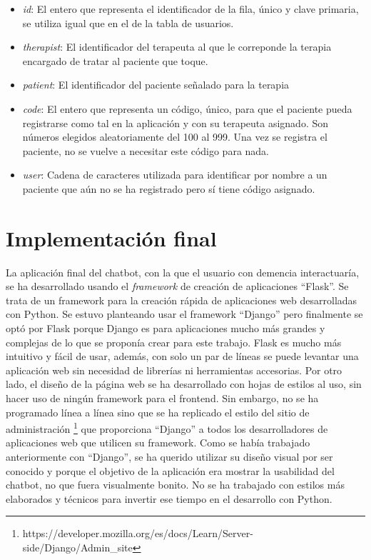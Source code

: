 \begin{itemize}
	\item \textit{id}: El entero que representa el identificador de la fila, único y clave primaria, se utiliza igual que en el de la tabla de usuarios.
	\item \textit{therapist}: El identificador del terapeuta al que le correponde la terapia  encargado de tratar al paciente que toque.
	\item \textit{patient}: El identificador del paciente señalado para la terapia
	\item \textit{code}: El entero que representa un código, único, para que el paciente pueda registrarse como tal en la aplicación y con su terapeuta asignado. Son números elegidos aleatoriamente del 100 al 999. Una vez se registra el paciente, no se vuelve a necesitar este código para nada.
	\item \textit{user}: Cadena de caracteres utilizada para identificar por nombre a un paciente que aún no se ha registrado pero sí tiene código asignado.
\end{itemize}


\section{Implementación final}

La aplicación final del chatbot, con la que el usuario con demencia interactuaría, se ha desarrollado usando el \textit{framework} de creación de aplicaciones ``Flask''. Se trata de un framework para la creación rápida de aplicaciones web desarrolladas con Python. Se estuvo planteando usar el framework ``Django'' pero finalmente se optó por Flask porque Django es para aplicaciones mucho más grandes y complejas de lo que se proponía crear para este trabajo. Flask es mucho más intuitivo y fácil de usar, además, con solo un par de líneas se puede levantar una aplicación web sin necesidad de librerías ni herramientas accesorias. Por otro lado, el diseño de la página web se ha desarrollado con hojas de estilos al uso, sin hacer uso de ningún framework para el frontend. Sin embargo, no se ha programado línea a línea sino que se ha replicado el estilo del sitio de administración \footnote{https://developer.mozilla.org/es/docs/Learn/Server-side/Django/Admin\_site} que proporciona ``Django'' a todos los desarrolladores de aplicaciones web que utilicen su framework. Como se había trabajado anteriormente con ``Django'', se ha querido utilizar su diseño visual por ser conocido y porque el objetivo de la aplicación era mostrar la usabilidad del chatbot, no que fuera visualmente bonito. No se ha trabajado con estilos más elaborados y técnicos para invertir ese tiempo en el desarrollo con Python.

